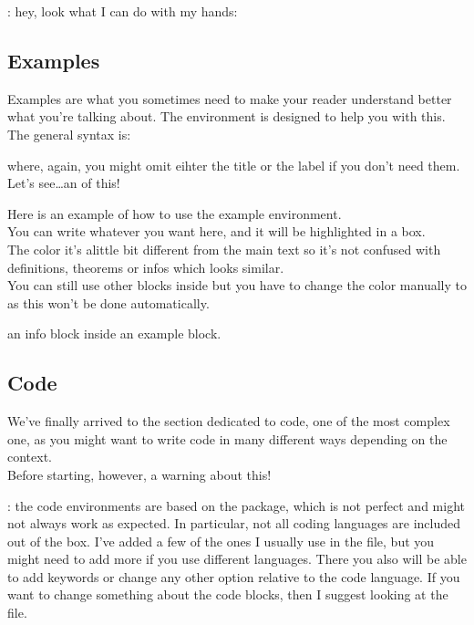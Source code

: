 \documentclass[../main.tex]{subfiles}
\begin{document}
\begin{blueinfo}
	: hey, look what I can do with my hands:
\end{blueinfo}

\pagebreak
\subsection{Examples}

Examples are what you sometimes need to make your reader understand better what
you're talking about. The  environment is designed to help you with
this. The general syntax is:

\begin{center}
\end{center}

where, again, you might omit eihter the title or the label if you don't need them.\\
Let's see\dots an  of this! 

\begin{example}
	Here is an example of how to use the example environment.\\
	You can write whatever you want here, and it will be highlighted in a box.\\
	The color it's alittle bit different from the main text so it's not confused
	with definitions, theorems or infos which looks similar.\\
	You can still use other blocks inside but you have to change the color
	manually to  as this won't be done automatically.
	\begin{info}
		 an info block inside an example block.
	\end{info}
\end{example}


\pagebreak
\subsection{Code}

We've finally arrived to the section dedicated to code, one of the most complex
one, as you might want to write code in many different ways depending on the context.\\
Before starting, however, a warning about this!

\begin{warning}
	: the code environments are based on the  package,
	which is not perfect and might not always work as expected. In particular,
	not all coding languages are included out of the box. I've added a few of
	the ones I usually use in the  file, but you might need
	to add more if you use different languages. There you also will be able to
	add keywords or change any other option relative to the code language. If you want to change something about the code blocks, then I suggest looking at the  file.
\end{warning}
\end{document}
